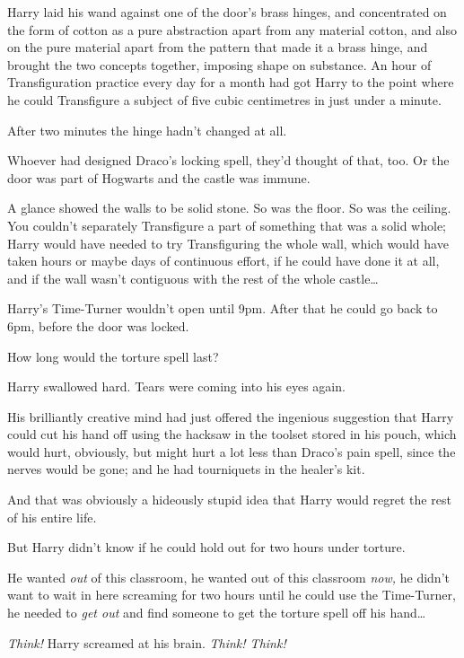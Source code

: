 Harry laid his wand against one of the door’s brass hinges, and concentrated on
the form of cotton as a pure abstraction apart from any material cotton, and
also on the pure material apart from the pattern that made it a brass hinge,
and brought the two concepts together, imposing shape on substance. An hour of
Transfiguration practice every day for a month had got Harry to the point
where he could Transfigure a subject of five cubic centimetres in just under a
minute.

After two minutes the hinge hadn’t changed at all.

Whoever had designed Draco’s locking spell, they’d thought of that, too. Or the
door was part of Hogwarts and the castle was immune.

A glance showed the walls to be solid stone. So was the floor. So was the
ceiling. You couldn’t separately Transfigure a part of something that was a
solid whole; Harry would have needed to try Transfiguring the whole wall, which
would have taken hours or maybe days of continuous effort, if he could have
done it at all, and if the wall wasn’t contiguous with the rest of the whole
castle…

Harry’s Time-Turner wouldn’t open until 9pm. After that he could go back to
6pm, before the door was locked.

How long would the torture spell last?

Harry swallowed hard. Tears were coming into his eyes again.

His brilliantly creative mind had just offered the ingenious suggestion that
Harry could cut his hand off using the hacksaw in the toolset stored in his
pouch, which would hurt, obviously, but might hurt a lot less than Draco’s pain
spell, since the nerves would be gone; and he had tourniquets in the healer’s
kit.

And that was obviously a hideously stupid idea that Harry would regret the rest
of his entire life.

But Harry didn’t know if he could hold out for two hours under torture.

He wanted \emph{out} of this classroom, he wanted out of this classroom
\emph{now,} he didn’t want to wait in here screaming for two hours until he
could use the Time-Turner, he needed to \emph{get out} and find someone to get
the torture spell off his hand…

\emph{Think!} Harry screamed at his brain. \emph{Think! Think!}

\later

